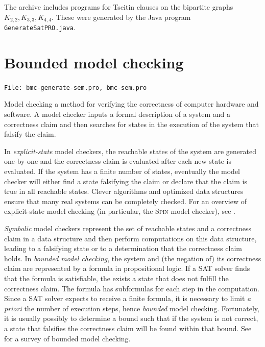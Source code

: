 \documentclass[11pt]{report}
\newcommand*{\p}[1]{\textup{\texttt{#1}}}
\newcommand*{\fl}[1]{\parbox{\textwidth}{\raggedleft \p{File: #1}}}
\begin{document}
\bigskip

The archive includes programs for Tseitin clauses on the bipartite graphs $K_{2,2}, K_{3,3}, K_{4,4}$. These were generated by the Java program \texttt{GenerateSatPRO.java}.


\chapter{Bounded model checking}\label{ch.model}

\fl{bmc-generate-sem.pro, bmc-sem.pro}

Model checking a method for verifying the correctness of computer
hardware and software. A model checker inputs a formal description of a
system and a correctness claim and then searches for states in the
execution of the system that falsify the claim.

In \emph{explicit-state} model checkers, the reachable states of the
system are generated one-by-one and the correctness claim is evaluated
after each new state is evaluated. If the system has a finite number of
states, eventually the model checker will either find
a state falsifying the claim or declare that the claim is true in all
reachable states. Clever algorithms and optimized data structures ensure
that many real systems can be completely checked. For an overview of
explicit-state model checking (in particular, the \textsc{Spin} model
checker), see \cite{primer}.

\emph{Symbolic} model checkers represent the set of reachable states and
a correctness claim in a data structure and then perform computations on
this data structure, leading to a falsifying state or to a determination
that the correctness claim holds. In \emph{bounded model checking}, the
system and (the negation of) its correctness claim are represented by a
formula in propositional logic. If a SAT solver finds that the formula
is satisfiable, the exists a state that does not fulfill the correctness
claim. The formula has subformulas for each step in the computation.
Since a SAT solver expects to receive a finite formula, it is necessary
to limit \textit{a priori} the number of execution steps, hence
\emph{bounded} model checking. Fortunately, it is usually possibly to
determine a bound such that if the system is not correct, a state that
falsifies the correctness claim will be found within that bound. See
\cite{bmc} for a survey of bounded model checking.
\end{document}
